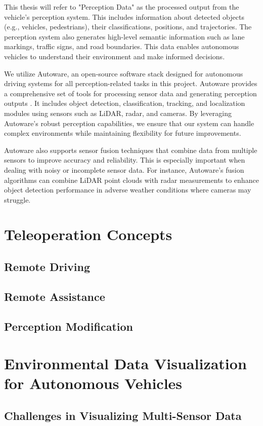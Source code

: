 This thesis will refer to "Perception Data" as the processed output from the vehicle's perception system. This includes information about detected objects (e.g., vehicles, pedestrians), their classifications, positions, and trajectories. The perception system also generates high-level semantic information such as lane markings, traffic signs, and road boundaries. This data enables autonomous vehicles to understand their environment and make informed decisions.

We utilize Autoware, an open-source software stack designed for autonomous driving systems for all perception-related tasks in this project. Autoware provides a comprehensive set of tools for processing sensor data and generating perception outputs \cite{kato2018autoware}. It includes object detection, classification, tracking, and localization modules using sensors such as LiDAR, radar, and cameras. By leveraging Autoware's robust perception capabilities, we ensure that our system can handle complex environments while maintaining flexibility for future improvements.

Autoware also supports sensor fusion techniques that combine data from multiple sensors to improve accuracy and reliability. This is especially important when dealing with noisy or incomplete sensor data. For instance, Autoware's fusion algorithms can combine LiDAR point clouds with radar measurements to enhance object detection
performance in adverse weather conditions where cameras may struggle.
\section{Teleoperation Concepts}
\subsection{Remote Driving}
\subsection{Remote Assistance}
\subsection{Perception Modification}

\section{Environmental Data Visualization for Autonomous Vehicles}
\subsection{Challenges in Visualizing Multi-Sensor Data}
